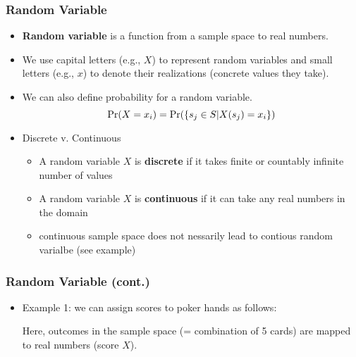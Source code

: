 \documentclass[pdflatex, 12pt]{beamer}
\begin{document}
\begin{frame}
\frametitle{Random Variable}
\begin{itemize}
\item \textbf{Random variable} is a function from a sample space to real numbers.
\vspace{0.4cm}
\item We use capital letters (e.g., $X$) to represent random variables and small letters (e.g., $x$) to denote their realizations (concrete values they take).
\vspace{0.4cm}
\item We can also define probability for a random variable.
 \begin{equation}
 \Pr(X = x_i) = \Pr(\left\{s_j \in S|X(s_j) = x_i\right\}) \notag
 \end{equation}
\item Discrete v. Continuous 
 \begin{itemize}
 \item A random variable $X$ is \textbf{discrete} if it takes finite or countably infinite number of values
 \item A random variable $X$ is \textbf{continuous} if it can take any real numbers in the domain
 \item continuous sample space does not nessarily lead to contious random varialbe (see example)
 \end{itemize}
\end{itemize}
\end{frame}

\begin{frame}
\frametitle{Random Variable (cont.)}
\begin{itemize}
\item Example 1: we can assign scores to poker hands as follows:
 \begin{table}
 \end{table}
Here, outcomes in the sample space (= combination of 5 cards) are mapped to real numbers (score $X$).
\end{itemize} 
\end{frame}
\end{document}
